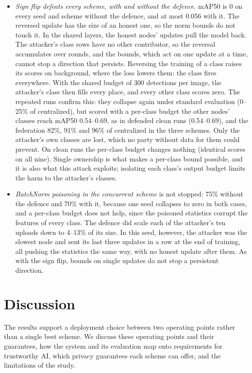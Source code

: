 \documentclass[pdflatex,sn-mathphys-num]{sn-jnl}
\begin{document}
\begin{itemize}
\item \emph{Sign flip defeats every scheme, with and without the defence.} mAP50 is 0 on every seed and scheme without the defence, and at most 0.056 with it. The reversed update has the size of an honest one, so the norm bounds do not touch it. In the shared layers, the honest nodes' updates pull the model back. The attacker's class rows have no other contributor, so the reversal accumulates over rounds, and the bounds, which act on one update at a time, cannot stop a direction that persists. Reversing the training of a class raises its scores on background, where the loss lowers them: the class fires everywhere. With the shared budget of 300 detections per image, the attacker's class then fills every place, and every other class scores zero. The repeated runs confirm this: they collapse again under standard evaluation (0--25\% of centralized), but scored with a per-class budget the other nodes' classes reach mAP50 0.54--0.69, as in defended clean runs (0.54--0.69), and the federation 82\%, 91\% and 96\% of centralized in the three schemes. Only the attacker's own classes are lost, which no party without data for them could prevent. On clean runs the per-class budget changes nothing (identical scores on all nine). Single ownership is what makes a per-class bound possible, and it is also what this attack exploits; isolating each class's output budget limits the harm to the attacker's classes.
\item \emph{BatchNorm poisoning in the concurrent scheme} is not stopped: 75\% without the defence and 70\% with it, because one seed collapses to zero in both cases, and a per-class budget does not help, since the poisoned statistics corrupt the features of every class. The defence did scale each of the attacker's ten uploads down to 4--13\% of its size. In this seed, however, the attacker was the slowest node and sent its last three updates in a row at the end of training, all pushing the statistics the same way, with no honest update after them. As with the sign flip, bounds on single updates do not stop a persistent direction.
\end{itemize}

\section{Discussion}\label{sec:discussion}

The results support a deployment choice between two operating points rather than a single best scheme. We discuss these operating points and their guarantees, how the system and its evaluation map onto requirements for trustworthy AI, which privacy guarantees each scheme can offer, and the limitations of the study.
\end{document}
